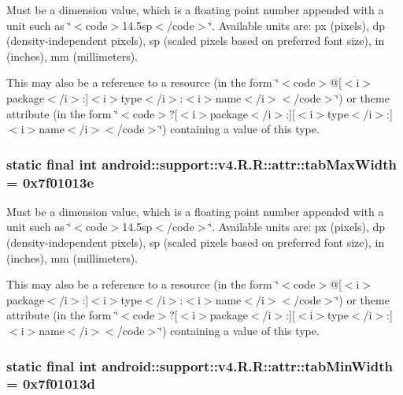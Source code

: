 Must be a dimension value, which is a floating point number appended with a unit such as \char`\"{}$<$code$>$14.5sp$<$/code$>$\char`\"{}. Available units are: px (pixels), dp (density-independent pixels), sp (scaled pixels based on preferred font size), in (inches), mm (millimeters). 

This may also be a reference to a resource (in the form \char`\"{}$<$code$>$@\mbox{[}$<$i$>$package$<$/i$>$:\mbox{]}$<$i$>$type$<$/i$>$:$<$i$>$name$<$/i$>$$<$/code$>$\char`\"{}) or theme attribute (in the form \char`\"{}$<$code$>$?\mbox{[}$<$i$>$package$<$/i$>$:\mbox{]}\mbox{[}$<$i$>$type$<$/i$>$:\mbox{]}$<$i$>$name$<$/i$>$$<$/code$>$\char`\"{}) containing a value of this type. \hypertarget{classandroid_1_1support_1_1v4_1_1_r_1_1attr_d81cd4f4c0595cd4b23f0823af70ebb6}{
\subsubsection[{tabMaxWidth}]{\setlength{\rightskip}{0pt plus 5cm}static final int android::support::v4.R.R::attr::tabMaxWidth = 0x7f01013e}}
\label{classandroid_1_1support_1_1v4_1_1_r_1_1attr_d81cd4f4c0595cd4b23f0823af70ebb6}


Must be a dimension value, which is a floating point number appended with a unit such as \char`\"{}$<$code$>$14.5sp$<$/code$>$\char`\"{}. Available units are: px (pixels), dp (density-independent pixels), sp (scaled pixels based on preferred font size), in (inches), mm (millimeters). 

This may also be a reference to a resource (in the form \char`\"{}$<$code$>$@\mbox{[}$<$i$>$package$<$/i$>$:\mbox{]}$<$i$>$type$<$/i$>$:$<$i$>$name$<$/i$>$$<$/code$>$\char`\"{}) or theme attribute (in the form \char`\"{}$<$code$>$?\mbox{[}$<$i$>$package$<$/i$>$:\mbox{]}\mbox{[}$<$i$>$type$<$/i$>$:\mbox{]}$<$i$>$name$<$/i$>$$<$/code$>$\char`\"{}) containing a value of this type. \hypertarget{classandroid_1_1support_1_1v4_1_1_r_1_1attr_ae07f6d6023cfa3800dd0f68c48ffbfa}{
\subsubsection[{tabMinWidth}]{\setlength{\rightskip}{0pt plus 5cm}static final int android::support::v4.R.R::attr::tabMinWidth = 0x7f01013d}}
\label{classandroid_1_1support_1_1v4_1_1_r_1_1attr_ae07f6d6023cfa3800dd0f68c48ffbfa}


